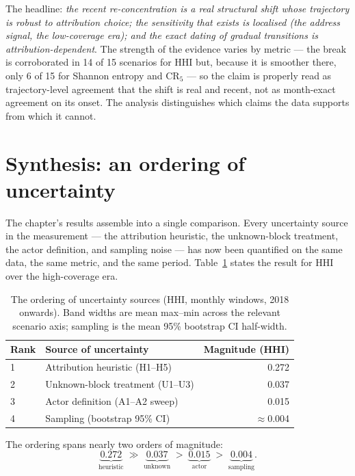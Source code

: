 \documentclass[logo,msc]{infthesis}           %
\begin{document}
The headline: \emph{the recent re-concentration is a real structural shift
whose trajectory is robust to attribution choice; the sensitivity that exists
is localised (the address signal, the low-coverage era); and the exact dating
of gradual transitions is attribution-dependent}. The strength of the evidence
varies by metric --- the break is corroborated in 14 of 15 scenarios for HHI
but, because it is smoother there, only 6 of 15 for Shannon entropy and
$\mathrm{CR}_5$ --- so the claim is properly read as trajectory-level agreement
that the shift is real and recent, not as month-exact agreement on its onset.
The analysis distinguishes which claims the data supports from which it cannot.
 
\section{Synthesis: an ordering of uncertainty}
\label{sec:res-synthesis}
 
The chapter's results assemble into a single comparison. Every uncertainty
source in the measurement --- the attribution heuristic, the unknown-block
treatment, the actor definition, and sampling noise --- has now been quantified
on the same data, the same metric, and the same period.
Table~\ref{tab:ordering} states the result for HHI over the high-coverage era.
 
\begin{table}[t]
  \centering
  \caption{The ordering of uncertainty sources (HHI, monthly windows, 2018
  onwards). Band widths are mean max--min across the relevant scenario axis;
  sampling is the mean 95\% bootstrap CI half-width.}
  \label{tab:ordering}
  \begin{tabular}{llr}
    \toprule
    Rank & Source of uncertainty & Magnitude (HHI) \\
    \midrule
    1 & Attribution heuristic (H1--H5)      & 0.272 \\
    2 & Unknown-block treatment (U1--U3)    & 0.037 \\
    3 & Actor definition (A1--A2 sweep)     & 0.015 \\
    4 & Sampling (bootstrap 95\% CI)        & $\approx$0.004 \\
    \bottomrule
  \end{tabular}
\end{table}
 
The ordering spans nearly two orders of magnitude:
\begin{equation}
  \underbrace{0.272}_{\text{heuristic}} \;\gg\;
  \underbrace{0.037}_{\text{unknown}} \;>\;
  \underbrace{0.015}_{\text{actor}} \;>\;
  \underbrace{0.004}_{\text{sampling}} .
  \label{eq:ordering}
\end{equation}
 
\end{document}
